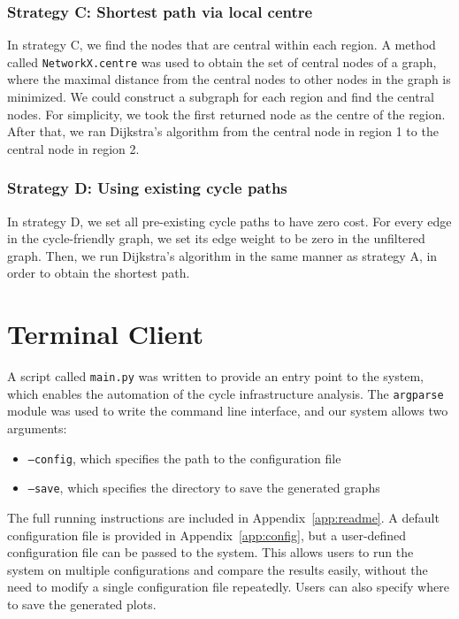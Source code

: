 \documentclass[12pt,a4paper]{report}
\begin{document}
\subsubsection*{Strategy C: Shortest path via local centre}
In strategy C, we find the nodes that are central within each region. A method called \texttt{NetworkX.centre} was used to obtain the set of central nodes of a graph, where the maximal distance from the central nodes to other nodes in the graph is minimized. We could construct a subgraph for each region and find the central nodes. For simplicity, we took the first returned node as the centre of the region. After that, we ran Dijkstra's algorithm from the central node in region 1 to the central node in region 2.

\subsubsection*{Strategy D: Using existing cycle paths}
In strategy D, we set all pre-existing cycle paths to have zero cost. For every edge in the cycle-friendly graph, we set its edge weight to be zero in the unfiltered graph. Then, we run Dijkstra's algorithm in the same manner as strategy A, in order to obtain the shortest path.

\section{Terminal Client}\label{sec:client}
A script called \texttt{main.py} was written to provide an entry point to the system, which enables the automation of the cycle infrastructure analysis. The \texttt{argparse} module was used to write the command line interface, and our system allows two arguments:
\begin{itemize}
    \item \texttt{--config}, which specifies the path to the configuration file
    \item \texttt{--save}, which specifies the directory to save the generated graphs
\end{itemize}

The full running instructions are included in Appendix~\ref{app:readme}. A default configuration file is provided in Appendix~\ref{app:config}, but a user-defined configuration file can be passed to the system. This allows users to run the system on multiple configurations and compare the results easily, without the need to modify a single configuration file repeatedly. Users can also specify where to save the generated plots.
\end{document}

